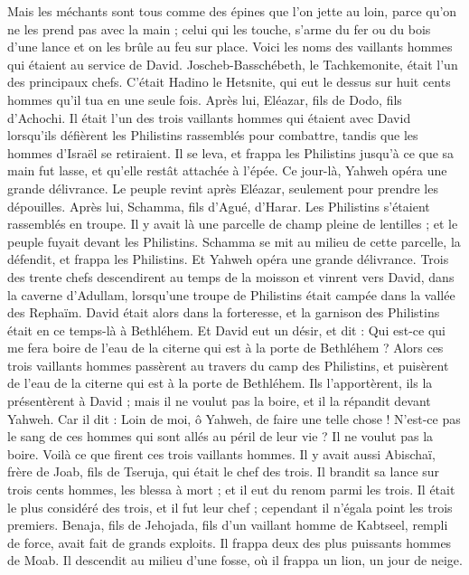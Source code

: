\begin{multicols}{2}
Mais les méchants sont tous comme des épines que l’on jette au loin, parce qu'on ne les prend pas avec la main ;
celui qui les touche, s’arme du fer ou du bois d'une lance et on les brûle au feu sur place.
Voici les noms des vaillants hommes qui étaient au service de David. Joscheb-Basschébeth, le Tachkemonite, était l’un des principaux chefs. C’était Hadino le Hetsnite, qui eut le dessus sur huit cents hommes qu'il tua en une seule fois.
Après lui, Eléazar, fils de Dodo, fils d'Achochi. Il était l'un des trois vaillants hommes qui étaient avec David lorsqu'ils défièrent les Philistins rassemblés pour combattre, tandis que les hommes d'Israël se retiraient.
Il se leva, et frappa les Philistins jusqu'à ce que sa main fut lasse, et qu'elle restât attachée à l'épée. Ce jour-là, Yahweh opéra une grande délivrance. Le peuple revint après Eléazar, seulement pour prendre les dépouilles.
Après lui, Schamma, fils d'Agué, d'Harar. Les Philistins s'étaient rassemblés en troupe. Il y avait là une parcelle de champ pleine de lentilles ; et le peuple fuyait devant les Philistins.
Schamma se mit au milieu de cette parcelle, la défendit, et frappa les Philistins. Et Yahweh opéra une grande délivrance.
Trois des trente chefs descendirent au temps de la moisson et vinrent vers David, dans la caverne d'Adullam, lorsqu'une troupe de Philistins était campée dans la vallée des Rephaïm.
David était alors dans la forteresse, et la garnison des Philistins était en ce temps-là à Bethléhem.
Et David eut un désir, et dit : Qui est-ce qui me fera boire de l'eau de la citerne qui est à la porte de Bethléhem ?
Alors ces trois vaillants hommes passèrent au travers du camp des Philistins, et puisèrent de l'eau de la citerne qui est à la porte de Bethléhem. Ils l’apportèrent, ils la présentèrent à David ; mais il ne voulut pas la boire, et il la répandit devant Yahweh.
Car il dit : Loin de moi, ô Yahweh, de faire une telle chose ! N'est-ce pas le sang de ces hommes qui sont allés au péril de leur vie ? Il ne voulut pas la boire. Voilà ce que firent ces trois vaillants hommes.
Il y avait aussi Abischaï, frère de Joab, fils de Tseruja, qui était le chef des trois. Il brandit sa lance sur trois cents hommes, les blessa à mort ; et il eut du renom parmi les trois.
Il était le plus considéré des trois, et il fut leur chef ; cependant il n’égala point les trois premiers.
Benaja, fils de Jehojada, fils d'un vaillant homme de Kabtseel, rempli de force, avait fait de grands exploits. Il frappa deux des plus puissants hommes de Moab. Il descendit au milieu d’une fosse, où il frappa un lion, un jour de neige.

\end{multicols}
